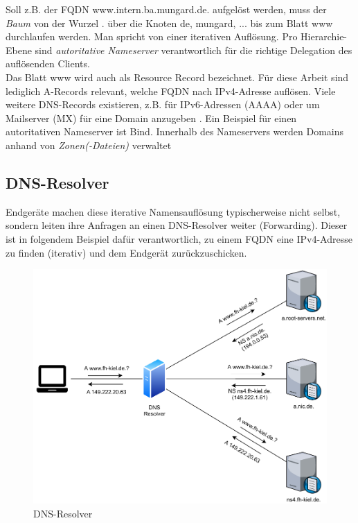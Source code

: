 Soll z.B. der FQDN www.intern.ba.mungard.de. aufgelöst werden, muss der \textit{Baum} von der Wurzel \glqq .\grqq{} über die Knoten de, mungard, ... bis zum Blatt www durchlaufen werden. Man spricht von einer iterativen Auflösung. Pro Hierarchie-Ebene sind \textit{autoritative Nameserver} verantwortlich für die richtige Delegation des auflösenden Clients.\\
Das Blatt www wird auch als Resource Record bezeichnet. Für diese Arbeit sind lediglich A-Records relevant, welche FQDN nach IPv4-Adresse auflösen. Viele weitere DNS-Records existieren, z.B. für IPv6-Adressen (AAAA) oder um Mailserver (MX) für eine Domain anzugeben \cite[S.528]{Fall2011}. Ein Beispiel für einen autoritativen Nameserver ist Bind. Innerhalb des Nameservers werden Domains anhand von \textit{Zonen(-Dateien)} verwaltet

\subsection{DNS-Resolver}
Endgeräte machen diese iterative Namensauflösung typischerweise nicht selbst, sondern leiten ihre Anfragen an einen DNS-Resolver weiter (\glqq Forwarding\grqq{}). Dieser ist in folgendem Beispiel dafür verantwortlich, zu einem FQDN eine IPv4-Adresse zu finden (iterativ) und dem Endgerät zurückzuschicken.

\begin{figure}[h]
  \centering
  \includegraphics{Figures/dns_recursion.pdf}
  \caption{DNS-Resolver}
  \label{grafik: dns-resolver}
\end{figure}\FloatBarrier

